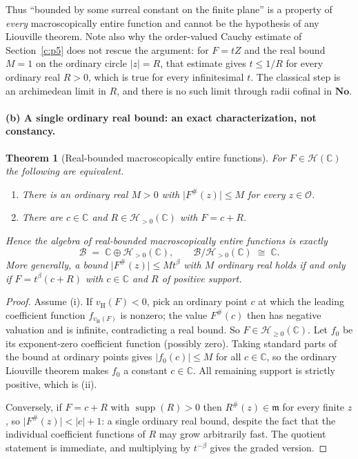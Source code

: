 \documentclass[11pt,a4paper]{article}
\numberwithin{equation}{section}
\newtheorem{theorem}{Theorem}[section]
\theoremstyle{definition}
\theoremstyle{remark}
\theoremstyle{plain}
\newcommand{\No}{\mathbf{No}}
\newcommand{\CC}{\mathbb C}
\newcommand{\Ov}{\mathcal O}
\newcommand{\mm}{\mathfrak m}
\DeclareMathOperator{\supp}{supp}
\newcommand{\tm}{t}
\newcommand{\ev}[1]{#1^{\#}}
\newcommand{\Hc}{\mathcal H}
\newcommand{\vH}{v_{\mathrm H}}
\newcommand{\abs}[1]{\lvert #1\rvert}
\begin{document}
Thus ``bounded by some surreal constant on the finite plane'' is a
property of \emph{every} macroscopically entire function and cannot be the
hypothesis of any Liouville theorem.  Note also why the order-valued
Cauchy estimate of Section~\ref{c:p5} does not rescue the argument: for $F=\tm Z$ and
the real bound $M=1$ on the ordinary circle $\abs z=R$, that estimate
gives $\tm\le1/R$ for every ordinary real $R>0$, which is true for every
infinitesimal $\tm$.  The classical step is an archimedean limit in $R$,
and there is no such limit through radii cofinal in $\No$.

\paragraph{(b) A single ordinary real bound: an exact characterization,
not constancy.}

\begin{theorem}[Real-bounded macroscopically entire functions]
\label{e:thm-realliouville}
For $F\in\Hc(\CC)$ the following are equivalent.
\begin{enumerate}[label=\textup{(\roman*)}]
\item There is an \emph{ordinary real} $M>0$ with
      $\abs{\ev F(z)}\le M$ for every $z\in\Ov$.
\item There are $c\in\CC$ and $R\in\Hc_{>0}(\CC)$ with $F=c+R$.
\end{enumerate}
Hence the algebra of real-bounded macroscopically entire functions is
exactly
\begin{equation}\label{e:eq-liouvillealgebra}
 \mathcal B\;=\;\CC\oplus\Hc_{>0}(\CC),
 \qquad \mathcal B/\Hc_{>0}(\CC)\;\cong\;\CC .
\end{equation}
More generally, a bound $\abs{\ev F(z)}\le M\tm^{\beta}$ with $M$ ordinary
real holds if and only if $F=\tm^{\beta}(c+R)$ with $c\in\CC$ and $R$ of
positive support.
\end{theorem}

\begin{proof}
Assume (i).  If $\vH(F)<0$, pick an ordinary point $c$ at which the
leading coefficient function $f_{\vH(F)}$ is nonzero; the value
$\ev F(c)$ then has negative valuation and is infinite, contradicting a
real bound.  So $F\in\Hc_{\ge0}(\CC)$.  Let $f_0$ be its exponent-zero
coefficient function (possibly zero).  Taking standard parts of the bound
at ordinary points gives $\abs{f_0(c)}\le M$ for all $c\in\CC$, so the
ordinary Liouville theorem makes $f_0$ a constant $c\in\CC$.  All remaining
support is strictly positive, which is (ii).

Conversely, if $F=c+R$ with $\supp(R)>0$ then $\ev R(z)\in\mm$ for every
finite $z$, so $\abs{\ev F(z)}<\abs c+1$: a single ordinary real bound,
despite the fact that the individual coefficient functions of $R$ may grow
arbitrarily fast.  The quotient statement is immediate, and multiplying by
$\tm^{-\beta}$ gives the graded version.
\end{proof}
\end{document}
